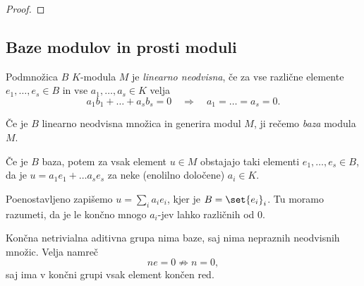\begin{primer}
    
\end{primer}

\begin{definicija}
    
\end{definicija}

\begin{lema}
    
\end{lema}

\begin{proof}
    
\end{proof}

\begin{definicija}
    
\end{definicija}


\subsection{Baze modulov in prosti moduli}

\begin{definicija}
    Podmnožica $B$ $K$-modula $M$ je \emph{linearno neodvisna}, če 
    za vse različne elemente $e_1, \dots, e_s \in B$ in vse $a_1, \dots, a_s \in K$ velja
    \[
        a_1b_1 + \dots + a_sb_s = 0 \quad \Rightarrow \quad a_1 = \dots = a_s = 0.
    \]
\end{definicija}

\begin{definicija}
    Če je $B$ linearno neodvisna množica in generira modul $M$, ji rečemo \emph{baza}
    modula $M$.
\end{definicija}

Če je $B$ baza, potem za vsak element $u \in M$ obstajajo taki elementi $e_1, \dots, e_s \in B$,
da je $u = a_1e_1 + \dots a_se_s$ za neke (enolilno določene) $a_i \in K$.

Poenostavljeno zapišemo $u = \sum_i a_i e_i$, kjer je $B = \set{e_i}_i$. Tu moramo razumeti, 
da je le končno mnogo $a_i$-jev lahko različnih od $0$.

\begin{primer}
    Končna netrivialna aditivna grupa nima baze, saj nima nepraznih neodvisnih množic. Velja namreč
    \[
        ne = 0 \not\Rightarrow n = 0, 
    \]
    saj ima v končni grupi vsak element končen red.
\end{primer}

